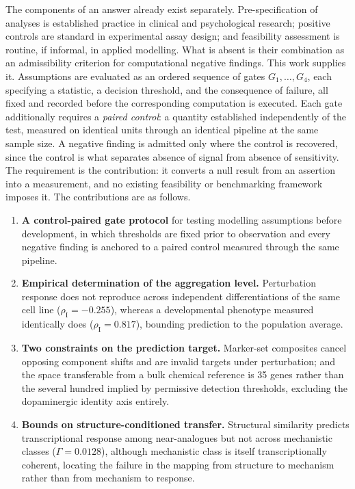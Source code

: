 \documentclass[5p,times,twocolumn]{elsarticle}
\begin{document}
The components of an answer already exist separately. Pre-specification of
analyses is established practice in clinical and psychological research;
positive controls are standard in experimental assay design; and feasibility
assessment is routine, if informal, in applied modelling. What is absent is
their combination as an admissibility criterion for computational negative
findings. This work supplies it. Assumptions are evaluated as an ordered
sequence of gates $G_1,\dots,G_4$, each specifying a statistic, a decision
threshold, and the consequence of failure, all fixed and recorded before the
corresponding computation is executed. Each gate additionally requires a
\emph{paired control}: a quantity established independently of the test,
measured on identical units through an identical pipeline at the same sample
size. A negative finding is admitted only where the control is recovered, since
the control is what separates absence of signal from absence of sensitivity.
The requirement is the contribution: it converts a null result from an assertion
into a measurement, and no existing feasibility or benchmarking framework
imposes it. The
contributions are as follows.

\begin{enumerate}
\item \textbf{A control-paired gate protocol} for testing modelling
assumptions before development, in which thresholds are fixed prior to
observation and every negative finding is anchored to a paired control measured through the same pipeline.

\item \textbf{Empirical determination of the aggregation level.} Perturbation
response does not reproduce across independent differentiations of the same
cell line ($\rho_\mathrm{I}=-0.255$), whereas a developmental phenotype
measured identically does ($\rho_\mathrm{I}=0.817$), bounding prediction to the
population average.

\item \textbf{Two constraints on the prediction target.} Marker-set composites
cancel opposing component shifts and are invalid targets under perturbation;
and the space transferable from a bulk chemical reference is 35 genes rather
than the several hundred implied by permissive detection thresholds, excluding
the dopaminergic identity axis entirely.

\item \textbf{Bounds on structure-conditioned transfer.} Structural similarity
predicts transcriptional response among near-analogues but not across
mechanistic classes ($\Gamma = 0.0128$), although mechanistic class is itself
transcriptionally coherent, locating the failure in the mapping from structure
to mechanism rather than from mechanism to response.
\end{enumerate}
\end{document}
